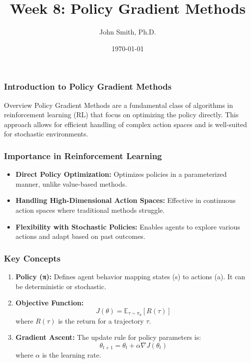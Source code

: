 \documentclass[aspectratio=169]{beamer}
\title[Policy Gradient Methods]{Week 8: Policy Gradient Methods}
\author[J. Smith]{John Smith, Ph.D.}
\institute[University Name]{
  Department of Computer Science\\
  University Name\\
  \vspace{0.3cm}
  Email: email@university.edu\\
  Website: www.university.edu
}
\date{\today}
\begin{document}
\frame{\titlepage}

\begin{frame}[fragile]
    \frametitle{Introduction to Policy Gradient Methods}
    \begin{block}{Overview}
        Policy Gradient Methods are a fundamental class of algorithms in reinforcement learning (RL) that focus on optimizing the policy directly. This approach allows for efficient handling of complex action spaces and is well-suited for stochastic environments.
    \end{block}
\end{frame}

\begin{frame}[fragile]
    \frametitle{Importance in Reinforcement Learning}
    \begin{itemize}
        \item \textbf{Direct Policy Optimization:} Optimizes policies in a parameterized manner, unlike value-based methods.
        \item \textbf{Handling High-Dimensional Action Spaces:} Effective in continuous action spaces where traditional methods struggle.
        \item \textbf{Flexibility with Stochastic Policies:} Enables agents to explore various actions and adapt based on past outcomes.
    \end{itemize}
\end{frame}

\begin{frame}[fragile]
    \frametitle{Key Concepts}
    \begin{enumerate}
        \item \textbf{Policy (π):} Defines agent behavior mapping states (s) to actions (a). It can be deterministic or stochastic.
        \item \textbf{Objective Function:} 
        \begin{equation}
            J(θ) = \mathbb{E}_{\tau \sim π_θ} \left[ R(τ) \right]
        \end{equation}
        where \( R(τ) \) is the return for a trajectory \( τ \).
        \item \textbf{Gradient Ascent:} The update rule for policy parameters is:
        \begin{equation}
            θ_{t+1} = θ_t + α \nabla J(θ_t)
        \end{equation}
        where \( α \) is the learning rate.
    \end{enumerate}
\end{frame}
\end{document}
